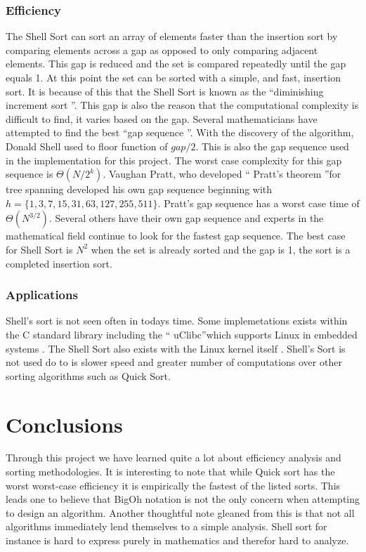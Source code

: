 \documentclass{article}
\begin{document}
    \subsubsection{Efficiency}
        The Shell Sort can sort an array of elements faster than the insertion
        sort by comparing elements across a gap as opposed to only comparing
        adjacent elements. This gap is reduced and the set is compared
        repeatedly until the gap equals 1. At this point the set can be sorted
        with a simple, and fast, insertion sort. It is because of this that the
        Shell Sort is known as the \textquotedblleft diminishing increment sort
        \textquotedblright \cite{education}. This gap is also the reason that
        the computational complexity is difficult to find, it varies based on
        the gap. Several mathematicians have attempted to find the best
        \textquotedblleft gap sequence \textquotedblright. With the discovery
        of the algorithm, Donald Shell used to floor function of $gap / 2$.
        This is also the gap sequence used in the implementation for this
        project. The worst case complexity for this gap sequence is
        $\Theta (N/2^k)$. Vaughan Pratt, who developed \textquotedblleft
        Pratt's theorem \textquotedblright for tree spanning developed his own
        gap sequence beginning with $h= \{ 1, 3, 7, 15, 31, 63, 127, 255, 511
        \}$. Pratt's gap sequence has a worst case time of $\Theta (N^{3/2})$.
        Several others have their own gap sequence and experts in the
        mathematical field continue to look for the fastest gap
        sequence\cite{princton}. The best case for Shell Sort is $N^2$ when the
        set is already sorted and the gap is 1, the sort is a completed 
        insertion sort.\\
    \subsubsection{Applications}
        Shell's sort is not seen often in todays time. Some implemetations 
        exists within the C standard library including the \textquotedblleft 
        uClibc\textquotedblright which supports Linux in embedded systems
        \cite{uClibc}. The Shell Sort also exists with the Linux kernel itself
        \cite{kernel}. Shell's Sort is not used do to is slower speed and 
        greater number of computations over other sorting algorithms such as 
        Quick Sort.\\
\section{Conclusions}
Through this project we have learned quite a lot about efficiency analysis and
sorting methodologies. It is interesting to note that while Quick sort has the
worst worst-case efficiency it is empirically the fastest of the listed sorts.
This leads one to believe that BigOh notation is not the only concern when
attempting to design an algorithm. Another thoughtful note gleaned from this
is that not all algorithms immediately lend themselves to a simple analysis.
Shell sort for instance is hard to express purely in mathematics and therefor
hard to analyze.
\end{document}

